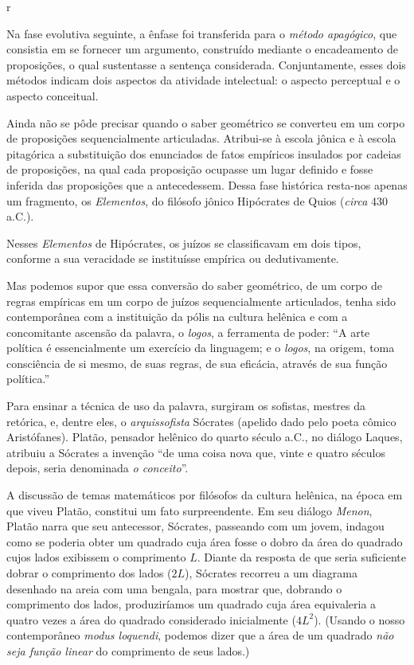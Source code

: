 r\documentclass{hipatia}
\begin{document}
Na fase evolutiva seguinte, a ênfase foi transferida para o \emph{método apagógico}, que consistia em se fornecer um argumento, construído mediante o encadeamento de proposições, o qual sustentasse a sentença considerada. Conjuntamente, esses dois métodos indicam dois aspectos da atividade intelectual: o aspecto perceptual e o aspecto conceitual.  \cite[p. 121]{otte2006}

Ainda não se pôde precisar quando o saber geométrico se converteu em um corpo de proposições sequencialmente articuladas. Atribui-se à escola jônica e à escola pitagórica a substituição dos enunciados de fatos empíricos insulados por cadeias de proposições, na qual cada proposição ocupasse um lugar definido e fosse inferida das proposições que a antecedessem. Dessa fase histórica resta-nos apenas um fragmento, os \emph{Elementos}, do filósofo jônico Hipócrates de Quios (\emph{circa} 430 a.C.).  \cite[p. 120]{kagan1986}\cite[p. 1]{sommerville1958}\cite[p. 39--40]{struik1987}

Nesses \emph{Elementos} de Hipócrates, os juízos se classificavam em dois tipos, conforme a sua veracidade se instituísse empírica ou dedutivamente.  \cite[p. 12]{smogorzhevski1976}

Mas podemos supor que essa conversão do saber geométrico, de um corpo de regras empíricas em um corpo de juízos sequencialmente articulados, tenha sido contemporânea com a instituição da pólis na cultura helênica e com a concomitante ascensão da palavra, o \emph{logos}, a ferramenta de poder: ``A arte política é essencialmente um exercício da linguagem; e o \emph{logos}, na origem, toma consciência de si mesmo, de suas regras, de sua eficácia, através de sua função política.'' \cite[p. 17]{chatelet1994}\cite[p. 35]{vernant1984}

Para ensinar a técnica de uso da palavra, surgiram os sofistas, mestres da retórica, e, dentre eles, o \emph{arquissofista} Sócrates (apelido dado pelo poeta cômico Aristófanes).  Platão, pensador helênico do quarto século a.C., no diálogo Laques, atribuiu a Sócrates a invenção ``de uma coisa nova que, vinte e quatro séculos depois, seria denominada \emph{o conceito}''. \cite[p. 20]{chatelet1994}

A discussão de temas matemáticos por filósofos da cultura helênica, na época em que viveu Platão, constitui um fato surpreendente. Em seu diálogo \emph{Menon}, Platão narra que seu antecessor, Sócrates, passeando com um jovem, indagou como se poderia obter um quadrado cuja área fosse o dobro da área do quadrado cujos lados exibissem o comprimento $L$. Diante da resposta de que seria suficiente dobrar o comprimento dos lados  ($2L$), Sócrates recorreu a um diagrama desenhado na areia com uma bengala, para mostrar que, dobrando o comprimento dos lados,  produziríamos um quadrado cuja área equivaleria a quatro vezes a área do quadrado considerado inicialmente  ($4L^2$). (Usando o nosso contemporâneo \emph{modus loquendi}, podemos dizer que a área de um quadrado \emph{não seja função linear} do comprimento de seus lados.)
\end{document}
